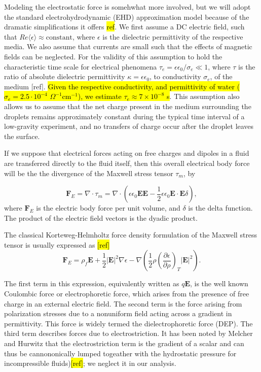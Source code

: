 \documentclass[a4paper, 12pt]{article}
\begin{document}
Modeling the electrostatic force is somehwhat more involved, but we will adopt the standard electrohydrodynamic (EHD) approximation model because of the dramatic simplifications it offers \hl{ref}. We first assume a DC electric field, such that $Re \langle \epsilon \rangle \approx  \mbox{constant}$, where $\epsilon$ is the dielectric permittivity of the respective media. We also assume that currents are small such that the effects of magnetic fields can be neglected. For the validity of this assumption to hold the characteristic time scale for electrical phenomena $\tau_e = \epsilon \epsilon_0/\sigma_e \ll 1$, where $\tau$ is the ratio of absolute dielectric permittivity $\kappa = \epsilon \epsilon_0$, to conductivity $\sigma_e$, of the medium [ref]. \hl{Given the respective conductivity, and permittivity of water ($\sigma_e = 2.5 \cdot 10^{-4}$ $\Omega^{-1} \mbox{cm}^{-1}$), we estimate $\tau_e \approx 7 \times 10^{-8}$ s}. This assumption also allows us to assume that the net charge present in the medium surrounding the droplets remains approximately constant during the typical time interval of a low-gravity experiment, and no transfers of charge occur after the droplet leaves the surface.

If we suppose that electrical forces acting on free charges and dipoles in a fluid are transferred directly to the fluid itself, then this overall electrical body force will be the the divergence of the Maxwell stress tensor $\tau_m $, by

\[ \mathbf{F}_E = \nabla \cdot \tau_m = \nabla \cdot \left( \epsilon \epsilon_0 \mathbf{E} \mathbf{E} - \frac{1}{2} \epsilon \epsilon_0 \mathbf{E} \cdot \mathbf{E} \delta \right) ,\]
where $\mathbf{F}_E$ is the electric body force per unit volume, and $\delta$ is the delta function. The product of the electric field vectors is the dyadic product.  

The classical Korteweg-Helmholtz force density formulation of the Maxwell stress tensor is usually expressed as \hl{[ref]}
\begin{equation}\label{force_density}
\mathbf{F}_E = \rho_f \mathbf{E} + \frac{1}{2} \left| \mathbf{E} \right|^2 \nabla \epsilon - \nabla \left( \frac{1}{2} \rho \left( \frac{\partial \epsilon}{\partial \rho} \right)_T \left| \mathbf{E} \right|^2 \right) .
\end{equation}

The first term in this expression, equivalently written as $q\mathbf{E}$, is the well known Coulombic force or electrophoretic force, which arises from the presence of free charge in an external electric field. The second term is the force arising from polarization stresses due to a nonuniform field acting across a gradient in permittivity. This force is widely termed the dielectrophoretic force (DEP). The third term describes forces due to electrostriction. It has been noted by Melcher and Hurwitz that the electrostriction term is the gradient of a scalar and can thus be cannononically lumped togeather with the hydrostatic pressure for incompressible fluids)\hl{[ref]}; we neglect it in our analysis. 
\end{document}
